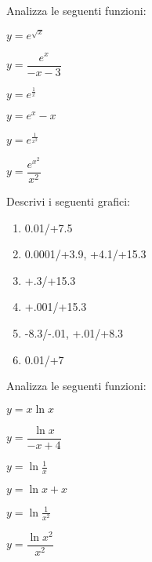 \begin{esercizio}\label{ese:stufun.5e}
Analizza le seguenti funzioni:
\begin{multicols}{3}
 \begin{enumeratea}
  \item \(y = e^{\sqrt{x}}\) \\ %
  \item \(y = \dfrac{e^x}{-x -3}\) %
  \item \(y = e^{\frac{1}{x}}\) \\ [.5em] %
  \item \(y = e^x-x\) %
  \item \(y = e^{\frac{1}{x^2}}\) \\ %
  \item \(y = \dfrac{e^{x^2}}{x^2}\) %
 \end{enumeratea}
\end{multicols}
\end{esercizio}

\bigskip

\begin{esercizio}\label{ese:stufun.6g}
Descrivi i seguenti grafici:
\begin{multicols}{2}
 \begin{enumerate} [left=0pt, label=\alph*)]
  \item \myp 
{}
{0.01/+7.5} %
  \item \myp 
{} 
{0.0001/+3.9, +4.1/+15.3} %
  \item \myp 
{} 
{+.3/+15.3} %
\vspace{1mm}
  \item \myp 
{}
{+.001/+15.3} %
  \item \myp 
{}
{-8.3/-.01, +.01/+8.3} %
  \item \myp 
{}
{0.01/+7} %
 \end{enumerate}
\end{multicols}
\end{esercizio}

\begin{esercizio}\label{ese:stufun.6e}
Analizza le seguenti funzioni:
\begin{multicols}{3}
 \begin{enumeratea}
  \item \(y = x \ln x\) \\ %
  \item \(y = \dfrac{\ln x}{-x +4}\) %
  \item \(y = \ln \frac{1}{x}\) \\ [.5em] %
  \item \(y = \ln x +x\) %
  \item \(y = \ln {\frac{1}{x^2}}\) \\ %
  \item \(y = \dfrac{\ln{x^2}}{x^2}\) %
 \end{enumeratea}
\end{multicols}
\end{esercizio}


